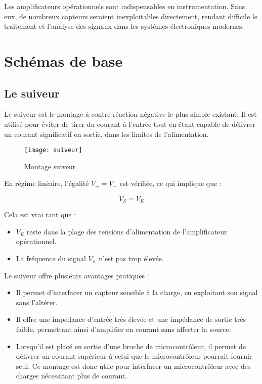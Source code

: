Les amplificateurs opérationnels sont indispensables en instrumentation. Sans 
eux, de nombreux capteurs seraient inexploitables directement, rendant difficile 
le traitement et l’analyse des signaux dans les systèmes électroniques modernes.


\section{Schémas de base}

\subsection{Le suiveur}

Le suiveur est le montage à contre-réaction négative le plus simple existant. Il 
est utilisé pour éviter de tirer du courant à l’entrée tout en étant capable de 
délivrer un courant significatif en sortie, dans les limites de l’alimentation.

\begin{figure}
    \centering
    \texttt{[image: suiveur]}
    \caption{Montage suiveur}
    \label{figSuiveur}
\end{figure}

En régime linéaire, l’égalité \( V_+ = V_- \) est vérifiée, ce qui implique que :

\[
V_S = V_E
\]

Cela est vrai tant que :
\begin{itemize}
    \item \( V_E \) reste dans la plage des tensions d’alimentation de 
    l’amplificateur opérationnel.
    \item La fréquence du signal \( V_E \) n’est pas trop élevée.
\end{itemize}

Le suiveur offre plusieurs avantages pratiques :
\begin{itemize}
    \item Il permet d’interfacer un capteur sensible à la charge, en exploitant 
    son signal sans l’altérer.
    \item Il offre une impédance d’entrée très élevée et une impédance de sortie
    très faible, permettant ainsi d’amplifier en courant sans affecter la source.
    \item Lorsqu'il est placé en sortie d’une broche de microcontrôleur, il 
    permet de délivrer un courant supérieur à celui que le microcontrôleur 
    pourrait fournir seul. Ce montage est donc utile pour interfacer un 
    microcontrôleur avec des charges nécessitant plus de courant.
\end{itemize}

